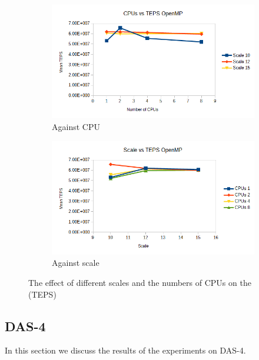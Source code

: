 \begin{figure}[!h]
\centering
\begin{subfigure}{.5\textwidth}
  \centering
  \includegraphics[width=\linewidth]{images/openmp_cpus.png}
  \caption{Against CPU}
  \label{fig:openmp_cpu}
\end{subfigure}%
\begin{subfigure}{.5\textwidth}
  \centering
  \includegraphics[width=\linewidth]{images/openmp_scale.png}
  \caption{Against scale}
  \label{fig:openmp_scale}
\end{subfigure}
\caption{The effect of different scales and the numbers of CPUs on the (TEPS)}
\label{fig:openmp_scale_cpu}
\end{figure}

\subsection{DAS-4}
In this section we discuss the results of the experiments on DAS-4.

